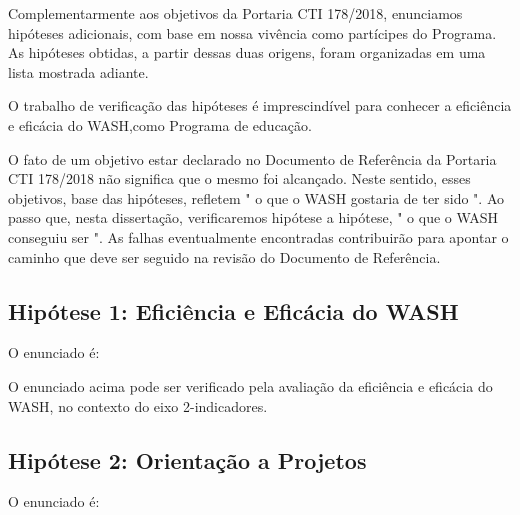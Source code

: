 Complementarmente aos objetivos da Portaria CTI 178/2018, enunciamos hipóteses adicionais, com base em nossa vivência como partícipes do Programa. As hipóteses obtidas, a partir dessas duas origens, foram organizadas em uma lista mostrada adiante.

O trabalho de verificação das hipóteses é imprescindível para conhecer a eficiência e eficácia do WASH,como Programa de educação.

O fato de um objetivo estar declarado no Documento de Referência da Portaria CTI 178/2018 não significa que o mesmo foi alcançado. Neste sentido, esses objetivos, base das hipóteses, refletem " o que o WASH gostaria de ter sido ". Ao passo que, nesta dissertação, verificaremos hipótese a hipótese, " o que o WASH conseguiu ser ". As falhas eventualmente encontradas contribuirão para apontar o caminho que deve ser seguido na revisão do Documento de Referência.

\subsection[Hipótese 1: Eficiência e Eficácia do WASH]{Hipótese 1: Eficiência e Eficácia do WASH}\label{Hipótese 1: Eficiência e Eficácia do WASH}
O enunciado é:


\noindent\begin{center}\mbox{\centering{}}\end{center}


O enunciado acima pode ser verificado pela avaliação da eficiência e eficácia do WASH, no contexto do eixo 2-indicadores.

\subsection[Hipótese 2: Orientação a Projetos]{Hipótese 2: Orientação a Projetos}\label{Hipótese 2: Orientação a Projetos}
O enunciado é:


\noindent\begin{center}\mbox{\centering{}}\end{center}


